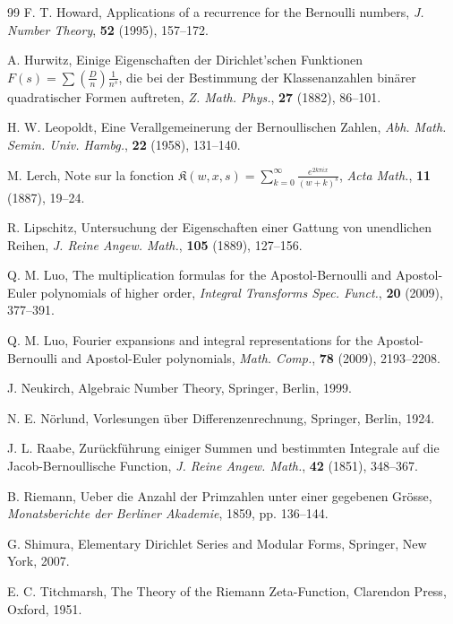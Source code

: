 \documentclass[reqno]{amsart}
\numberwithin{equation}{section}
\begin{document}
\begin{thebibliography}{99}
 F. T. Howard, Applications of a recurrence for the Bernoulli numbers, \emph{J. Number Theory}, \textbf{52} (1995), 157--172.

  A. Hurwitz, Einige Eigenschaften der Dirichlet'schen Funktionen $F(s)=\sum(\frac{D}{n})\frac{1}{n^{s}}$, die bei der Bestimmung der Klassenanzahlen bin\"{a}rer quadratischer Formen auftreten, \emph{Z. Math. Phys.}, \textbf{27} (1882), 86--101.

 H. W. Leopoldt, Eine Verallgemeinerung der Bernoullischen Zahlen, \emph{Abh. Math. Semin. Univ. Hambg.}, \textbf{22} (1958), 131--140.

 M. Lerch, Note sur la fonction $\mathfrak{K}(w,x,s)=\sum_{k=0}^{\infty} \frac{e^{2k\pi i x}}{(w+k)^s}$, \emph{Acta Math.}, \textbf{11} (1887), 19--24.

 R. Lipschitz, Untersuchung der Eigenschaften einer Gattung von unendlichen Reihen, \emph{J. Reine Angew. Math.}, \textbf{105} (1889), 127--156.

 Q. M. Luo, The multiplication formulas for the Apostol-Bernoulli and Apostol-Euler polynomials of higher order, \emph{Integral Transforms Spec. Funct.}, \textbf{20} (2009), 377--391.

 Q. M. Luo, Fourier expansions and integral representations for the Apostol-Bernoulli and Apostol-Euler polynomials, \emph{Math. Comp.}, \textbf{78} (2009), 2193--2208.

 J. Neukirch, Algebraic Number Theory, Springer, Berlin, 1999.

 N. E. N\"{o}rlund, Vorlesungen \"{u}ber Differenzenrechnung, Springer, Berlin, 1924.

 J. L. Raabe, Zur\"{u}ckf\"{u}hrung einiger Summen und bestimmten Integrale auf die Jacob-Bernoullische Function, \emph{J. Reine Angew. Math.}, \textbf{42} (1851), 348--367.

 B. Riemann, Ueber die Anzahl der Primzahlen unter einer gegebenen Gr\"{o}sse, \emph{Monatsberichte der Berliner Akademie}, 1859, pp. 136--144.

 G. Shimura, Elementary Dirichlet Series and Modular Forms, Springer, New York, 2007.

 E. C. Titchmarsh, The Theory of the Riemann Zeta-Function, Clarendon Press, Oxford, 1951.

\end{thebibliography}
\end{document}
